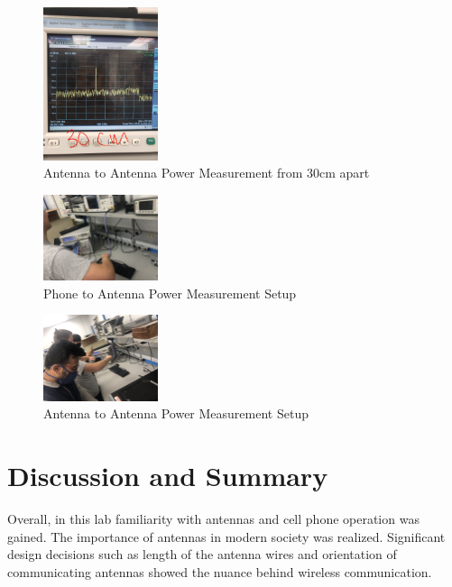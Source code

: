 \documentclass[journal]{IEEEtran}
\begin{document}
\begin{figure}[hp]
    \centering
    \includegraphics[width=0.3\textwidth]{txrx_30.JPG}
    \caption{\label{fig:txrx_30} Antenna to Antenna Power Measurement from 30cm apart}
\end{figure}

\begin{figure}[hp]
    \centering
    \includegraphics[width=0.3\textwidth]{phonerx_setup.jpg}
    \caption{\label{fig:phonerx_setup} Phone to Antenna Power Measurement Setup}
\end{figure}

\begin{figure}[hp]
    \centering
    \includegraphics[width=0.3\textwidth]{txrx_setup.jpg}
    \caption{\label{fig:txrx_setup} Antenna to Antenna Power Measurement Setup}
\end{figure}


\section{Discussion and Summary}

Overall, in this lab familiarity with antennas and cell phone operation was
gained. The importance of antennas in modern society was realized. Significant
design decisions such as length of the antenna wires and orientation of
communicating antennas showed the nuance behind wireless communication.
\appendices
\end{document}

